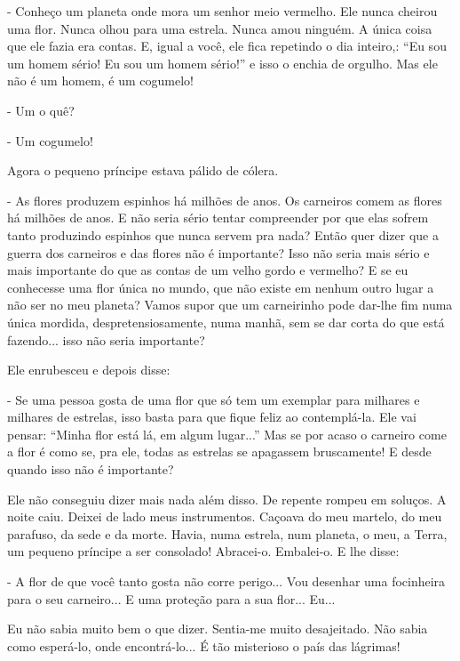 \begin{Parallel}[p]{}{}
{- Conheço um planeta onde mora um senhor meio vermelho. Ele nunca
cheirou uma flor. Nunca olhou para uma estrela. Nunca amou ninguém. A
única coisa que ele fazia era contas. E, igual a você, ele fica
repetindo o dia inteiro,: ``Eu sou um homem sério! Eu sou um homem
sério!'' e isso o enchia de orgulho. Mas ele não é um homem, é um
cogumelo!

- Um o quê?

- Um cogumelo!

Agora o pequeno príncipe estava pálido de cólera.

- As flores produzem espinhos há milhões de anos. Os carneiros comem as
flores há milhões de anos. E não seria sério tentar compreender por que
elas sofrem tanto produzindo espinhos que nunca servem pra nada? Então
quer dizer que a guerra dos carneiros e das flores não é importante?
Isso não seria mais sério e mais importante do que as contas de um velho
gordo e vermelho? E se eu conhecesse uma flor única no mundo, que não
existe em nenhum outro lugar a não ser no meu planeta? Vamos supor que
um carneirinho pode dar-lhe fim numa única mordida, despretensiosamente,
numa manhã, sem se dar corta do que está fazendo... isso não seria
importante?

Ele enrubesceu e depois disse:

- Se uma pessoa gosta de uma flor que só tem um exemplar para milhares e
milhares de estrelas, isso basta para que fique feliz ao contemplá-la.
Ele vai pensar: ``Minha flor está lá, em algum lugar...'' Mas se por
acaso o carneiro come a flor é como se, pra ele, todas as estrelas se
apagassem bruscamente! E desde quando isso não é importante?

Ele não conseguiu dizer mais nada além disso. De repente rompeu em
soluços. A noite caiu. Deixei de lado meus instrumentos. Caçoava do meu
martelo, do meu parafuso, da sede e da morte. Havia, numa estrela, num
planeta, o meu, a Terra, um pequeno príncipe a ser consolado! Abracei-o.
Embalei-o. E lhe disse:

- A flor de que você tanto gosta não corre perigo... Vou desenhar uma
focinheira para o seu carneiro... E uma proteção para a sua flor...
Eu...

Eu não sabia muito bem o que dizer. Sentia-me muito desajeitado. Não
sabia como esperá-lo, onde encontrá-lo... É tão misterioso o país das
lágrimas!

}

\end{Parallel}











